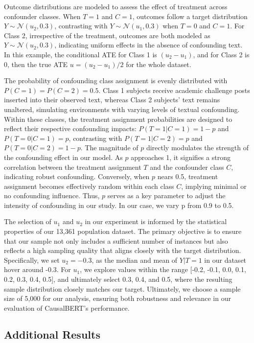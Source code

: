 \documentclass[11pt]{article}
\begin{document}
Outcome distributions are modeled to assess the effect of treatment across confounder classes. When $T=1$ and $C=1$, outcomes follow a target distribution $Y \sim \mathcal{N}(u_2, 0.3)$, contrasting with $Y \sim \mathcal{N}(u_1, 0.3)$ when $T=0$ and $C=1$. For Class 2, irrespective of the treatment, outcomes are both modeled as $Y \sim \mathcal{N}(u_2, 0.3)$, indicating uniform effects in the absence of confounding text. In this example, the conditional ATE for Class 1 is $(u_2-u_1)$, and for Class 2 is $0$, then the true ATE $u = (u_2-u_1)/2$ for the whole dataset. 

The probability of confounding class assignment is evenly distributed with $P(C=1) = P(C=2) = 0.5$. Class 1 subjects receive academic challenge posts inserted into their observed text, whereas Class 2 subjects' text remains unaltered, simulating environments with varying levels of textual confounding. Within these classes, the treatment assignment probabilities are designed to reflect their respective confounding impacts: $P(T=1 | C=1) = 1-p$ and $P(T=0 | C=1) = p$, contrasting with $P(T=1 | C=2) = p$ and $P(T=0 | C=2) = 1-p$. The magnitude of \( p \) directly modulates the strength of the confounding effect in our model. As \( p \) approaches 1, it signifies a strong correlation between the treatment assignment \( T \) and the confounder class \( C \), indicating robust confounding. Conversely, when \( p \) nears 0.5, treatment assignment becomes effectively random within each class \( C \), implying minimal or no confounding influence. Thus, \( p \) serves as a key parameter to adjust the intensity of confounding in our study. In our case, we vary p from 0.9 to 0.5.

The selection of \(u_1\) and \(u_2\) in our experiment is informed by the statistical properties of our 13,361 population dataset. The primary objective is to ensure that our sample not only includes a sufficient number of instances but also reflects a high sampling quality that aligns closely with the target distribution. Specifically, we set \(u_2 = -0.3\), as the median and mean of \(Y | T=1\) in our dataset hover around -0.3. For \(u_1\), we explore values within the range [-0.2, -0.1, 0.0, 0.1, 0.2, 0.3, 0.4, 0.5], and ultimately select 0.3, 0.4, and 0.5, where the resulting sample distribution closely matches our target. Ultimately, we choose a sample size of 5,000 for our analysis, ensuring both robustness and relevance in our evaluation of CausalBERT’s performance.


\subsection{Additional Results}
\label{additional_results}
\end{document}
